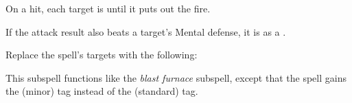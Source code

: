 
On a hit, each target is  until it puts out the fire.







If the attack result also beats a target's Mental defense, it is  as a .









Replace the spell's targets with the following:
\begin{spellcontent}

\begin{augmenttargetinginfo}




\end{augmenttargetinginfo}

\end{spellcontent}






This subspell functions like the \textit{blast furnace} subspell, except that the spell gains the  (minor) tag instead of the  (standard) tag.









